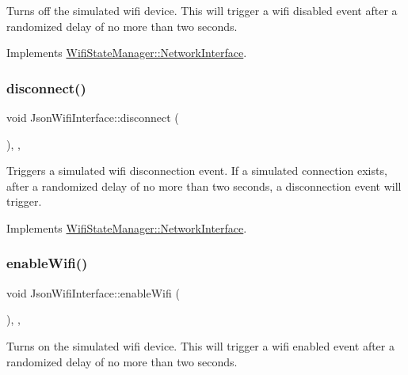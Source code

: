 Turns off the simulated wifi device. This will trigger a wifi disabled event after a randomized delay of no more than two seconds. 

Implements \mbox{\hyperlink{classWifiStateManager_1_1NetworkInterface_ab0dc19a7f15294a59894581a34d6109e}{Wifi\+State\+Manager\+::\+Network\+Interface}}.

\mbox{\label{classJsonWifiInterface_a4e9f35812633e8b2b50463f9523585e0}} 
\subsubsection{\texorpdfstring{disconnect()}{disconnect()}}
{\footnotesize\ttfamily void Json\+Wifi\+Interface\+::disconnect (\begin{DoxyParamCaption}{ }\end{DoxyParamCaption})\hspace{0.3cm}{\ttfamily [override]}, {\ttfamily [protected]}, {\ttfamily [virtual]}}

Triggers a simulated wifi disconnection event. If a simulated connection exists, after a randomized delay of no more than two seconds, a disconnection event will trigger. 

Implements \mbox{\hyperlink{classWifiStateManager_1_1NetworkInterface_a440fe19155e268f94cbbd4e133b95037}{Wifi\+State\+Manager\+::\+Network\+Interface}}.

\mbox{\label{classJsonWifiInterface_ac87e53c922fb19cf684d94d174aa6274}} 
\subsubsection{\texorpdfstring{enable\+Wifi()}{enableWifi()}}
{\footnotesize\ttfamily void Json\+Wifi\+Interface\+::enable\+Wifi (\begin{DoxyParamCaption}{ }\end{DoxyParamCaption})\hspace{0.3cm}{\ttfamily [override]}, {\ttfamily [protected]}, {\ttfamily [virtual]}}

Turns on the simulated wifi device. This will trigger a wifi enabled event after a randomized delay of no more than two seconds. 

